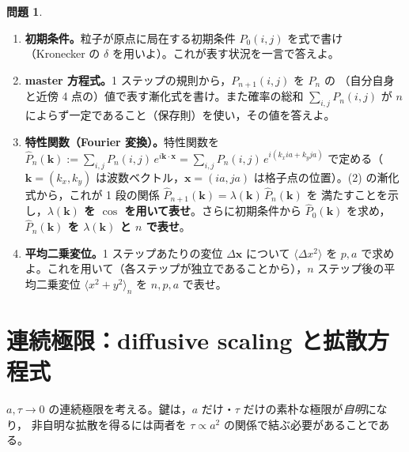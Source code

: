 \documentclass[dvipdfmx, uplatex]{jsarticle}
\newcommand{\bk}{\bm{k}}
\newcommand{\bx}{\bm{x}}
\theoremstyle{definition}
\newtheorem*{prob}{問題}
\begin{document}
\begin{prob}
\begin{enumerate}
\item \textbf{初期条件。}粒子が原点に局在する初期条件 $P_0(i,j)$ を式で書け
（Kronecker の $\delta$ を用いよ）。これが表す状況を一言で答えよ。
\item \textbf{master 方程式。}1 ステップの規則から，$P_{n+1}(i,j)$ を $P_n$ の
（自分自身と近傍 4 点の）値で表す漸化式を書け。また確率の総和 $\sum_{i,j}P_n(i,j)$ が
$n$ によらず一定であること（保存則）を使い，その値を答えよ。
\item \textbf{特性関数（Fourier 変換）。}特性関数を
$\displaystyle\hat P_n(\bk):=\sum_{i,j}P_n(i,j)\,e^{i\bk\cdot\bx}
=\sum_{i,j}P_n(i,j)\,e^{i(k_x ia+k_y ja)}$
で定める（$\bk=(k_x,k_y)$ は波数ベクトル，$\bx=(ia,ja)$ は格子点の位置）。(2) の漸化式から，これが
1 段の関係 $\hat P_{n+1}(\bk)=\lambda(\bk)\,\hat P_n(\bk)$ を
満たすことを示し，\textbf{$\lambda(\bk)$ を $\cos$ を用いて表せ}。さらに初期条件から $\hat P_0(\bk)$ を求め，
\textbf{$\hat P_n(\bk)$ を $\lambda(\bk)$ と $n$ で表せ}。
\item \textbf{平均二乗変位。}1 ステップあたりの変位 $\Delta\bx$ について $\langle\Delta x^2\rangle$ を
$p,a$ で求めよ。これを用いて（各ステップが独立であることから），$n$ ステップ後の平均二乗変位
$\langle x^2+y^2\rangle_n$ を $n,p,a$ で表せ。
\end{enumerate}
\end{prob}

\section{連続極限：diffusive scaling と拡散方程式}
$a,\tau\to0$ の連続極限を考える。鍵は，$a$ だけ・$\tau$ だけの素朴な極限が\emph{自明}になり，
非自明な拡散を得るには両者を $\tau\propto a^2$ の関係で結ぶ必要があることである。
\end{document}
